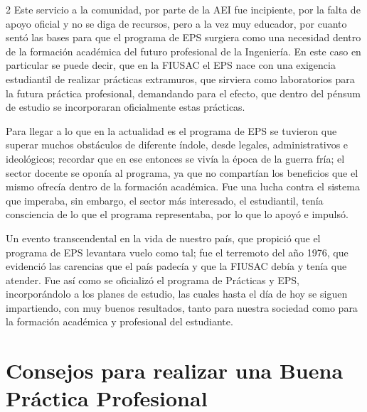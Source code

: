\documentclass[11pt,spanish,Letterpaper,openany]{book}
\begin{document}
\begin {multicols*}{2}
Este servicio a la comunidad, por parte de la AEI fue incipiente, por la falta de apoyo oficial y no se diga de recursos, pero a la vez muy educador, por cuanto sentó las bases para que el programa de EPS surgiera como una necesidad dentro de la formación académica del futuro profesional de la Ingeniería. En este caso en particular se puede decir, que en la FIUSAC el EPS nace con una exigencia estudiantil de realizar prácticas extramuros, que sirviera como laboratorios para la futura práctica profesional, demandando para el efecto, que dentro del pénsum de estudio se incorporaran oficialmente estas prácticas.

Para llegar a lo que en la actualidad es el programa de EPS se tuvieron que superar muchos obstáculos de diferente índole, desde legales, administrativos e ideológicos; recordar que en ese entonces se vivía la época de la guerra fría; el sector docente se oponía al programa, ya que no compartían los beneficios que el mismo ofrecía dentro de la formación académica. Fue una lucha contra el sistema que imperaba, sin embargo, el sector más interesado, el estudiantil, tenía consciencia de lo que el programa representaba, por lo que lo apoyó e impulsó.

Un evento transcendental en la vida de nuestro país, que propició que el programa de EPS levantara vuelo como tal; fue el terremoto del año 1976, que evidenció las carencias que el país padecía y que la FIUSAC debía y tenía que atender. Fue así como se oficializó el programa de Prácticas y EPS, incorporándolo a los planes de estudio, las cuales hasta el día de hoy se siguen impartiendo, con muy buenos resultados, tanto para nuestra sociedad como para la formación académica y profesional del estudiante.

\end {multicols*}

\hypertarget{oargueta}{%
\chapter{Consejos para realizar una Buena Práctica Profesional}\label{oargueta}}
\end{document}
